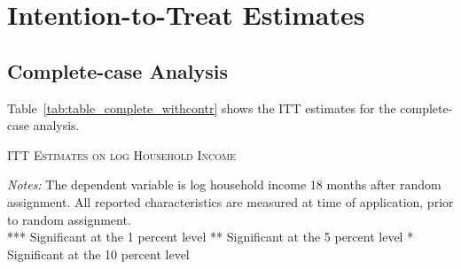 
\section{Intention-to-Treat Estimates}

\subsection{Complete-case Analysis}

Table~\ref{tab:table_complete_withcontr} shows the ITT estimates for the complete-case analysis.

\begin{table}[t!]
\centering
\caption{\textsc{ITT Estimates on log Household Income}}



\medskip
\begin{adjustbox}{width=0.825\textwidth, totalheight=\textheight, keepaspectratio}

\end{adjustbox}

\label{tab:table_complete_withcontr}
\bigskip
\raggedright
\footnotesize
\textit{Notes:} The dependent variable is log household income 18 months after random assignment. All reported characteristics are measured at time of application, prior to random assignment. \\
*** Significant at the 1 percent level ** Significant at the 5 percent level * Significant at the 10 percent level
\end{table}
